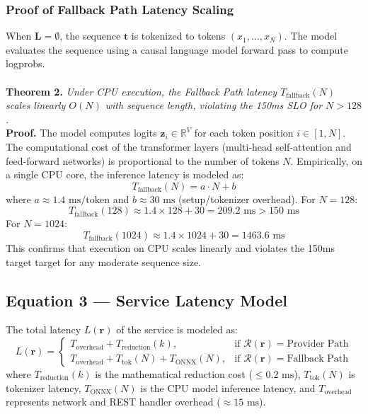\documentclass[10pt]{article}
\begin{document}
\subsubsection{Proof of Fallback Path Latency Scaling}
When $\mathbf{L} = \emptyset$, the sequence $\mathbf{t}$ is tokenized to tokens $(x_1, \dots, x_N)$. The model evaluates the sequence using a causal language model forward pass to compute logprobs.
\\
\\
\textbf{Theorem 2.} \textit{Under CPU execution, the Fallback Path latency $T_{\text{fallback}}(N)$ scales linearly $O(N)$ with sequence length, violating the 150ms SLO for $N > 128$.}
\\
\textbf{Proof.}
The model computes logits $\mathbf{z}_i \in \mathbb{R}^V$ for each token position $i \in [1, N]$. The computational cost of the transformer layers (multi-head self-attention and feed-forward networks) is proportional to the number of tokens $N$.
Empirically, on a single CPU core, the inference latency is modeled as:
\begin{equation}
T_{\text{fallback}}(N) = a \cdot N + b
\end{equation}
where $a \approx 1.4\text{ ms/token}$ and $b \approx 30\text{ ms}$ (setup/tokenizer overhead).
For $N = 128$:
\begin{equation}
T_{\text{fallback}}(128) \approx 1.4 \times 128 + 30 = 209.2\text{ ms} > 150\text{ ms}
\end{equation}
For $N = 1024$:
\begin{equation}
T_{\text{fallback}}(1024) \approx 1.4 \times 1024 + 30 = 1463.6\text{ ms}
\end{equation}
This confirms that execution on CPU scales linearly and violates the 150ms target target for any moderate sequence size.

\subsection{Equation 3 --- Service Latency Model}
The total latency $L(\mathbf{r})$ of the service is modeled as:
\begin{equation}
L(\mathbf{r}) = \begin{cases} T_{\text{overhead}} + T_{\text{reduction}}(k), & \text{if } \mathcal{R}(\mathbf{r}) = \text{Provider Path} \\ T_{\text{overhead}} + T_{\text{tok}}(N) + T_{\text{ONNX}}(N), & \text{if } \mathcal{R}(\mathbf{r}) = \text{Fallback Path} \end{cases}
\end{equation}
where $T_{\text{reduction}}(k)$ is the mathematical reduction cost ($\le 0.2\text{ ms}$), $T_{\text{tok}}(N)$ is tokenizer latency, $T_{\text{ONNX}}(N)$ is the CPU model inference latency, and $T_{\text{overhead}}$ represents network and REST handler overhead ($\approx 15\text{ ms}$).
\end{document}
